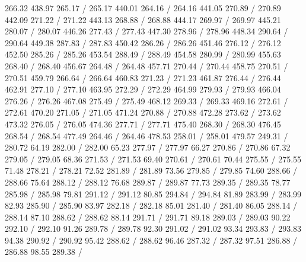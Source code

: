 { 266.32 438.97 265.17 /
 265.17 440.01 264.16 /
 264.16 441.05 270.89 /
 270.89 442.09 271.22 /
 271.22 443.13 268.88 /
 268.88 444.17 269.97 /
 269.97 445.21 280.07 /
 280.07 446.26 277.43 /
 277.43 447.30 278.96 /
 278.96 448.34 290.64 /
 290.64 449.38 287.83 /
 287.83 450.42 286.26 /
 286.26 451.46 276.12 /
 276.12 452.50 285.26 /
 285.26 453.54 288.49 /
 288.49 454.58 280.99 /
 280.99 455.63 268.40 /
 268.40 456.67 264.48 /
 264.48 457.71 270.44 /
 270.44 458.75 270.51 /
 270.51 459.79 266.64 /
 266.64 460.83 271.23 /
 271.23 461.87 276.44 /
 276.44 462.91 277.10 /
 277.10 463.95 272.29 /
 272.29 464.99 279.93 /
 279.93 466.04 276.26 /
 276.26 467.08 275.49 /
 275.49 468.12 269.33 /
 269.33 469.16 272.61 /
 272.61 470.20 271.05 /
 271.05 471.24 270.88 /
 270.88 472.28 273.62 /
 273.62 473.32 276.05 /
 276.05 474.36 277.71 /
 277.71 475.40 268.30 /
 268.30 476.45 268.54 /
 268.54 477.49 264.46 /
 264.46 478.53 258.01 /
 258.01 479.57 249.31 /
\setsolid
{} 280.72 64.19 282.00 /
 282.00 65.23 277.97 /
 277.97 66.27 270.86 /
 270.86 67.32 279.05 /
 279.05 68.36 271.53 /
 271.53 69.40 270.61 /
 270.61 70.44 275.55 /
 275.55 71.48 278.21 /
 278.21 72.52 281.89 /
 281.89 73.56 279.85 /
 279.85 74.60 288.66 /
 288.66 75.64 288.12 /
 288.12 76.68 289.87 /
 289.87 77.73 289.35 /
 289.35 78.77 285.98 /
 285.98 79.81 291.12 /
 291.12 80.85 294.84 /
 294.84 81.89 283.99 /
 283.99 82.93 285.90 /
 285.90 83.97 282.18 /
 282.18 85.01 281.40 /
 281.40 86.05 288.14 /
 288.14 87.10 288.62 /
 288.62 88.14 291.71 /
 291.71 89.18 289.03 /
 289.03 90.22 292.10 /
 292.10 91.26 289.78 /
 289.78 92.30 291.02 /
 291.02 93.34 293.83 /
 293.83 94.38 290.92 /
 290.92 95.42 288.62 /
 288.62 96.46 287.32 /
 287.32 97.51 286.88 /
 286.88 98.55 289.38 /
}
